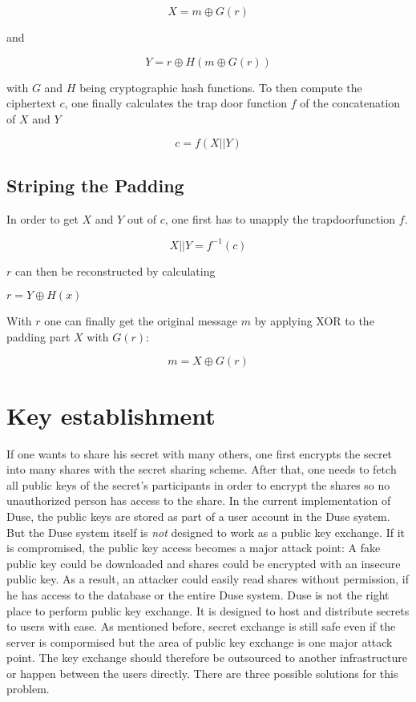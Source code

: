 $$X = m \oplus G(r)$$

and

$$Y = r \oplus H(m \oplus G(r))$$

with $G$ and $H$ being cryptographic hash functions. To then compute the
ciphertext $c$, one finally calculates the trap door function $f$ of the
concatenation of $X$ and $Y$

$$c = f(X || Y)$$

\subsection{Striping the Padding}

In order to get $X$ and $Y$ out of $c$, one first has to unapply the
trapdoorfunction $f$.

$$X || Y = f^{-1}(c)$$

$r$ can then be reconstructed by calculating

$r = Y \oplus H(x)$

With $r$ one can finally get the original message $m$ by applying XOR
to the padding part $X$ with $G(r)$:

$$m = X \oplus G(r)$$

\section{Key establishment}
\label{sec:key_establishment}

If one wants to share his secret with many others, one first encrypts the
secret into many shares with the secret sharing scheme. After that, one needs
to fetch all public keys of the secret's participants in order to encrypt the
shares so no unauthorized person has access to the share. In the current
implementation of Duse, the public keys are stored as part of a user account
in the Duse system. But the Duse system itself is \textit{not} designed to
work as a public key exchange. If it is compromised, the public key access
becomes a major attack point: A fake public key could be downloaded and shares
could be encrypted with an insecure public key. As a result, an attacker
could easily read shares without permission, if he has access to the database
or the entire Duse system. Duse is not the right place to perform public
key exchange. It is designed to host and distribute secrets to users with ease.
As mentioned before, secret exchange is still safe even if the server is compormised
but the area of public key exchange is one major attack point.
The key exchange should therefore be outsourced to another
infrastructure or happen between the users directly. There are three possible
solutions for this problem.

